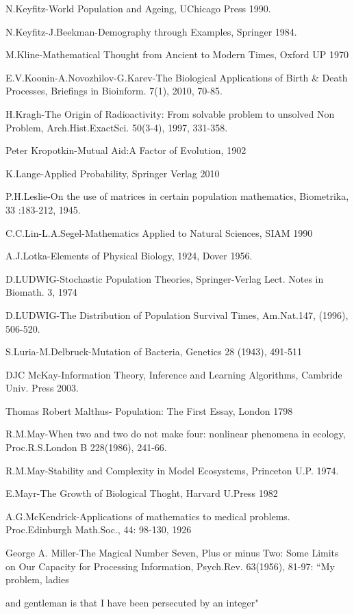 N.Keyfitz-World Population and Ageing, UChicago Press 1990.

N.Keyfitz-J.Beekman-Demography through Examples, Springer 1984.

M.Kline-Mathematical Thought from Ancient to Modern Times, Oxford UP 1970

E.V.Koonin-A.Novozhilov-G.Karev-The Biological Applications of Birth \& Death Processes, Briefings in Bioinform. 7(1), 2010, 70-85.

H.Kragh-The Origin of Radioactivity: From solvable problem to unsolved Non Problem, Arch.Hist.ExactSci. 50(3-4), 1997, 331-358.

Peter Kropotkin-Mutual Aid:A Factor of Evolution, 1902

K.Lange-Applied Probability, Springer Verlag 2010

P.H.Leslie-On the use of matrices in certain population mathematics, Biometrika, 33 :183-212, 1945.

C.C.Lin-L.A.Segel-Mathematics Applied to Natural Sciences, SIAM 1990

A.J.Lotka-Elements of Physical Biology, 1924, Dover 1956.

D.LUDWIG-Stochastic Population Theories, Springer-Verlag Lect. Notes in Biomath. 3, 1974

D.LUDWIG-The Distribution of Population Survival Times, Am.Nat.147, (1996), 506-520.

S.Luria-M.Delbruck-Mutation of Bacteria, Genetics 28 (1943), 491-511

DJC McKay-Information Theory, Inference and Learning Algorithms, Cambride Univ. Press 2003.

Thomas Robert Malthus- Population: The First Essay, London 1798

R.M.May-When two and two do not make four: nonlinear phenomena in ecology, Proc.R.S.London B 228(1986), 241-66.

R.M.May-Stability and Complexity in Model Ecosystems, Princeton U.P. 1974.

E.Mayr-The Growth of Biological Thoght, Harvard U.Press 1982

A.G.McKendrick-Applications of mathematics to medical problems. Proc.Edinburgh Math.Soc., 44: 98-130, 1926

George A. Miller-The Magical Number Seven, Plus or minus Two: Some Limits on Our Capacity for Processing Information, Psych.Rev. 63(1956), 81-97: ``My problem, ladies

and gentleman is that I have been persecuted by an integer"


